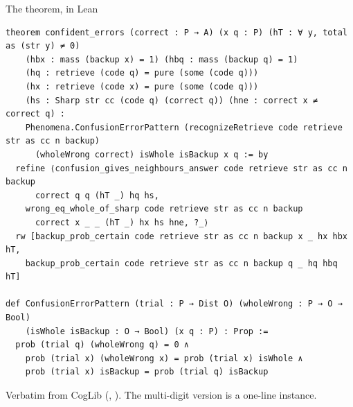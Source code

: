 \documentclass[aspectratio=169,11pt]{beamer}
\begin{document}
\begin{frame}[fragile]{The theorem, in Lean}
\begin{Verbatim}[fontsize=\scriptsize, breaklines=false]
theorem confident_errors (correct : P → A) (x q : P) (hT : ∀ y, total as (str y) ≠ 0)
    (hbx : mass (backup x) = 1) (hbq : mass (backup q) = 1)
    (hq : retrieve (code q) = pure (some (code q)))
    (hx : retrieve (code x) = pure (some (code q)))
    (hs : Sharp str cc (code q) (correct q)) (hne : correct x ≠ correct q) :
    Phenomena.ConfusionErrorPattern (recognizeRetrieve code retrieve str as cc n backup)
      (wholeWrong correct) isWhole isBackup x q := by
  refine ⟨confusion_gives_neighbours_answer code retrieve str as cc n backup
      correct q q (hT _) hq hs,
    wrong_eq_whole_of_sharp code retrieve str as cc n backup
      correct x _ _ (hT _) hx hs hne, ?_⟩
  rw [backup_prob_certain code retrieve str as cc n backup x _ hx hbx hT,
    backup_prob_certain code retrieve str as cc n backup q _ hq hbq hT]

def ConfusionErrorPattern (trial : P → Dist O) (wholeWrong : P → O → Bool)
    (isWhole isBackup : O → Bool) (x q : P) : Prop :=
  prob (trial q) (wholeWrong q) = 0 ∧
    prob (trial x) (wholeWrong x) = prob (trial x) isWhole ∧
    prob (trial x) isBackup = prob (trial q) isBackup
\end{Verbatim}
  \footnotesize Verbatim from CogLib (, ). The multi-digit version is a one-line instance.
\end{frame}
\end{document}
